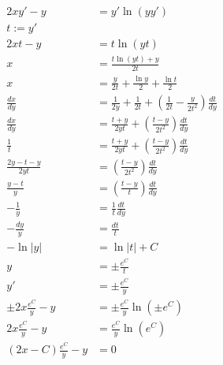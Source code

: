 \begin{align*}
    2xy'-y                  & = y'\ln (yy')                                                                           \\
    t := y'                                                                                                           \\
    2xt - y                 & = t \ln (yt)                                                                            \\
    x                       & = \frac{t\ln(yt) + y}{2t}                                                               \\
    x                       & = \frac{y}{2t} + \frac{\ln y}{2} + \frac{\ln t}{2}                                      \\
    \frac{dx}{dy}           & = \frac{1}{2y} + \frac{1}{2t} + \left(\frac{1}{2t} - \frac{y}{2t^2}\right)\frac{dt}{dy} \\
    \frac{dx}{dy}           & = \frac{t + y}{2yt} + \left(\frac{t - y}{2t^2}\right)\frac{dt}{dy}                      \\
    \frac{1}{t}             & = \frac{t + y}{2yt} + \left(\frac{t - y}{2t^2}\right)\frac{dt}{dy}                      \\
    \frac{2y - t - y}{2yt}  & = \left(\frac{t - y}{2t^2}\right)\frac{dt}{dy}                                          \\
    \frac{y - t}{y}         & = \left(\frac{t - y}{t}\right)\frac{dt}{dy}             \tag{1}                         \\
    -\frac{1}{y}            & = \frac{1}{t}\frac{dt}{dy}                                                              \\
    -\frac{dy}{y}           & = \frac{dt}{t}                                                                          \\
    -\ln|y|                 & = \ln|t| + C                                                                            \\
    y                       & = \pm\frac{e^C}{t}                                                                      \\
    y'                      & = \pm\frac{e^C}{y}                                                                      \\
    \pm 2x\frac{e^C}{y}-y   & = \pm\frac{e^C}{y}\ln (\pm e^C)                                                         \\
    2x\frac{e^C}{y}-y       & = \frac{e^C}{y}\ln (e^C)                                                                \\
    (2x - C)\frac{e^C}{y}-y & = 0                                                                                     \\
\end{align*}


